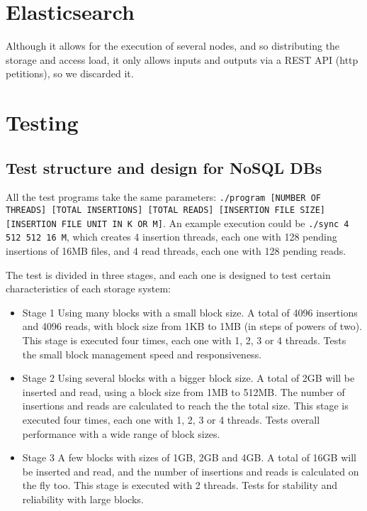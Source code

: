 \documentclass[11pt]{article}
\begin{document}
\section{Elasticsearch}

Although it allows for the execution of several nodes, and so distributing the storage and access load, it only allows inputs and outputs via a REST API (http petitions), so we discarded it.

\section{Testing}

\subsection{Test structure and design for NoSQL DBs}
All the test programs take the same parameters: \texttt{./program [NUMBER OF THREADS] [TOTAL INSERTIONS] [TOTAL READS] [INSERTION FILE SIZE] [INSERTION FILE UNIT IN K OR M]}. An example execution could be \texttt{./sync 4 512 512 16 M}, which creates 4 insertion threads, each one with 128 pending insertions of 16MB files, and 4 read threads, each one with 128 pending reads.

The test is divided in three stages, and each one is designed to test certain characteristics of each storage system:

\begin{itemize}
\item Stage 1
Using many blocks with a small block size. A total of 4096 insertions and 4096 reads, with block size from 1KB to 1MB (in steps of powers of two). This stage is executed four times, each one with 1, 2, 3 or 4 threads. Tests the small block management speed and responsiveness.
\item Stage 2
Using several blocks with a bigger block size. A total of 2GB will be inserted and read, using a block size from 1MB to 512MB. The number of insertions and reads are calculated to reach the the total size. This stage is executed four times, each one with 1, 2, 3 or 4 threads. Tests overall performance with a wide range of block sizes.
\item Stage 3
A few blocks with sizes of 1GB, 2GB and 4GB. A total of 16GB will be inserted and read, and the number of insertions and reads is calculated on the fly too. This stage is executed with 2 threads. Tests for stability and reliability with large blocks.
\end{itemize}
\end{document}
